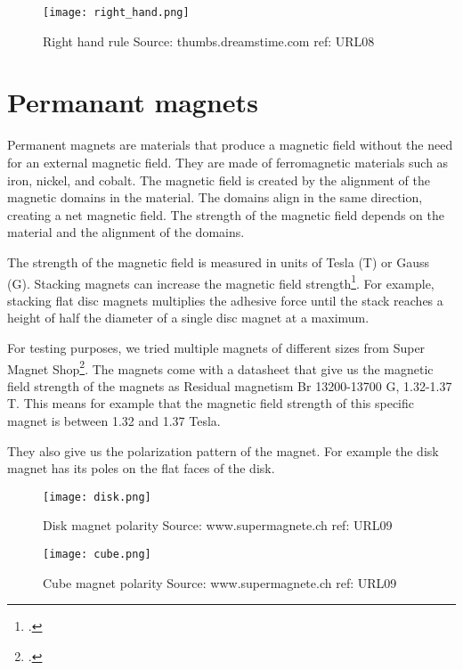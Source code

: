 \begin{figure}[H]
	\centering
	\texttt{[image: right\_hand.png]}
	\caption[Right hand rule]{Right hand rule Source: thumbs.dreamstime.com ref: URL08}
	\label{fig:right_hand_rule}
\end{figure}


\section{Permanant magnets}

Permanent magnets are materials that produce a magnetic field without the need for an external magnetic field. They are made of ferromagnetic materials such as iron, nickel, and cobalt. The magnetic field is created by the alignment of the magnetic domains in the material. The domains align in the same direction, creating a net magnetic field. The strength of the magnetic field depends on the material and the alignment of the domains.

The strength of the magnetic field is measured in units of Tesla (T) or Gauss (G). Stacking magnets can increase the magnetic field strength\footcite{noauthor_factors_nodate}. For example, stacking flat disc magnets multiplies the adhesive force until the stack reaches a height of half the diameter of a single disc magnet at a maximum.

For testing purposes, we tried multiple magnets of different sizes from Super Magnet Shop\footcite{noauthor_buy_nodate}. The magnets come with a datasheet that give us the magnetic field strength of the magnets as Residual magnetism Br 13200-13700 G, 1.32-1.37 T. This means for example that the magnetic field strength of this specific magnet is between 1.32 and 1.37 Tesla.

They also give us the polarization pattern of the magnet. For example the disk magnet has its poles on the flat faces of the disk.

\begin{figure}[H]
	\centering
	\texttt{[image: disk.png]}
	\caption[Disk magnet polarity]{Disk magnet polarity Source: www.supermagnete.ch ref: URL09}
	\label{fig:disk}
\end{figure}

\begin{figure}[H]
	\centering
	\texttt{[image: cube.png]}
	\caption[Cube magnet polarity]{Cube magnet polarity Source: www.supermagnete.ch ref: URL09}
	\label{fig:cube}
\end{figure}

